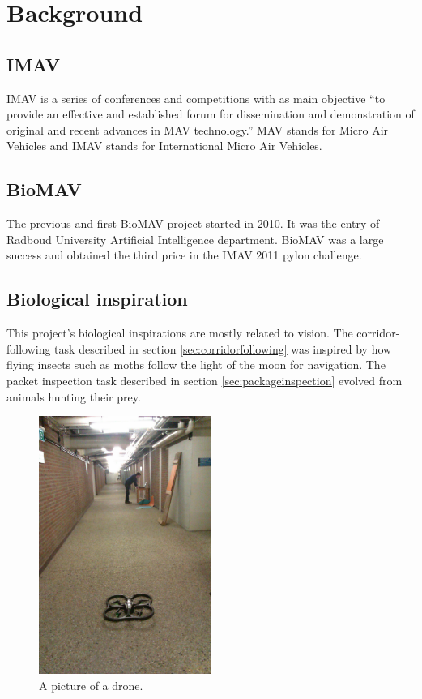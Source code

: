 \documentclass[a4paper,10pt]{article}
\begin{document}
\section{Background}
\label{sec:background}
\subsection{IMAV}
IMAV is a series of conferences and competitions with as main objective
``to provide an effective and established forum for dissemination and
demonstration of original and recent advances in MAV technology.''\cite{imav}
MAV stands for Micro Air Vehicles and IMAV stands for International
Micro Air Vehicles.

\subsection{BioMAV}
The previous and first BioMAV project started in 2010. It was the entry
of Radboud University Artificial Intelligence department. BioMAV was a large
success and obtained the third price in the IMAV 2011 pylon challenge.

\subsection{Biological inspiration}
This project's biological inspirations are mostly related to vision. The
corridor-following task described in section \ref{sec:corridorfollowing} was inspired by how flying insects such as moths
follow the light of the moon for navigation. The packet inspection task described in section \ref{sec:packageinspection}
evolved from animals hunting their prey.
\begin{figure}[h!]
	\caption{A picture of a drone.}
	\centering
	\includegraphics[width=0.5\textwidth]{images/boringHallway}
\end{figure}
\end{document}
